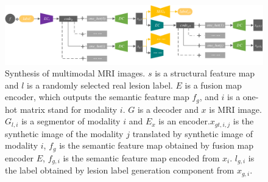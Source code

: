\documentclass{ecai}
\begin{document}
\begin{figure}
	\centering
	\includegraphics[width=1.98\columnwidth]{figures/mm_mri_generate}
	\caption{Synthesis of multimodal MRI images.
		 $s$ is a structural feature map and $l$ is a randomly selected real lesion label. $E$ is a fusion map encoder, which outputs the semantic feature map $f_g$, and  $i$ is a one-hot matrix stand for modality $i$. $G$ is a decoder and $x$ is MRI image. $G_{l,i}$ is a segmentor of modality $i$ and $E_x$ is an encoder.$x_{gt,i,j}$ is the synthetic image of the modality $j$ translated by synthetic image of modality $i$, $f_g$ is the semantic feature map obtained by fusion map encoder $E$, $f_{g,i}$ is the semantic feature map encoded from $x_i$. $l_{g,i}$ is the label obtained by lesion label generation component from $x_{g,i}$.
	}
	\label{mm_mri_generate}
\end{figure}
\end{document}
